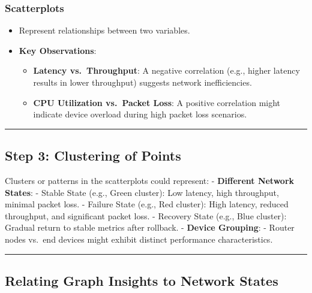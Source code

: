 \documentclass[11pt]{article}
\providecommand{\tightlist}{%
      \setlength{\itemsep}{0pt}\setlength{\parskip}{0pt}}
\begin{document}
\hypertarget{scatterplots}{%
\subsubsection{\texorpdfstring{\textbf{Scatterplots}}{Scatterplots}}\label{scatterplots}}

\begin{itemize}
\tightlist
\item
  Represent relationships between two variables.
\item
  \textbf{Key Observations}:

  \begin{itemize}
  \tightlist
  \item
    \textbf{Latency vs.~Throughput}: A negative correlation (e.g.,
    higher latency results in lower throughput) suggests network
    inefficiencies.
  \item
    \textbf{CPU Utilization vs.~Packet Loss}: A positive correlation
    might indicate device overload during high packet loss scenarios.
  \end{itemize}
\end{itemize}

\begin{center}\rule{0.5\linewidth}{0.5pt}\end{center}

\hypertarget{step-3-clustering-of-points}{%
\subsection{\texorpdfstring{\textbf{Step 3: Clustering of
Points}}{Step 3: Clustering of Points}}\label{step-3-clustering-of-points}}

Clusters or patterns in the scatterplots could represent: -
\textbf{Different Network States}: - Stable State (e.g., Green cluster):
Low latency, high throughput, minimal packet loss. - Failure State
(e.g., Red cluster): High latency, reduced throughput, and significant
packet loss. - Recovery State (e.g., Blue cluster): Gradual return to
stable metrics after rollback. - \textbf{Device Grouping}: - Router
nodes vs.~end devices might exhibit distinct performance
characteristics.

\begin{center}\rule{0.5\linewidth}{0.5pt}\end{center}

\hypertarget{relating-graph-insights-to-network-states}{%
\subsection{\texorpdfstring{\textbf{Relating Graph Insights to Network
States}}{Relating Graph Insights to Network States}}\label{relating-graph-insights-to-network-states}}
\end{document}
